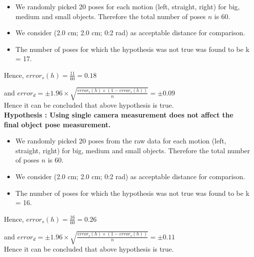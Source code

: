 \documentclass[10pt,a4paper]{article}
\begin{document}
					\begin{itemize}
						\item We randomly picked 20 poses for each motion (left, straight, right) for big, medium and small objects. Therefore the total number of poses $n$ is 60.
						
						\item We consider (2.0 cm; 2.0 cm; 0:2 rad) as acceptable distance for comparison.
						
						\item The number of poses for which the hypothesis was not true was found to be k = 17.
					\end{itemize}
					
					Hence, $error_s (h) = \frac{11}{60} = 0.18 $
					
					and $error_d = \pm 1.96 \times \sqrt{\frac{error_s (h) \times (1-error_s (h))}{n}} = \pm0.09$\\
					
					Hence it can be concluded that above hypothesis is true. \\
					
					\textbf{Hypothesis : Using single camera measurement does not affect the final object pose measurement.}
					
					\begin{itemize}
						\item We randomly picked 20 poses from the raw data for each motion (left, straight, right) for big, medium and small objects. Therefore the total number of poses $n$ is 60.
						
						\item We consider (2.0 cm; 2.0 cm; 0:2 rad) as acceptable distance for comparison.
						
						\item The number of poses for which the hypothesis was not true was found to be k = 16.
					\end{itemize}
					
					Hence, $error_s (h) = \frac{16}{60} = 0.26 $
					
					and $error_d = \pm 1.96 \times \sqrt{\frac{error_s (h) \times (1-error_s (h))}{n}} = \pm0.11$\\
					
					Hence it can be concluded that above hypothesis is true.
					
\end{document}
